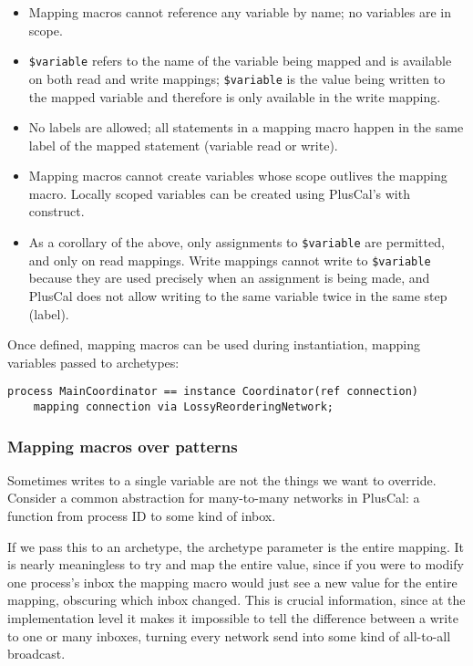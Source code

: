 \begin{itemize}
    \item Mapping macros cannot reference any variable by name; no variables are in scope.
    \item \lstinline|$variable| refers to the name of the variable being mapped and is available on both read and write mappings; \lstinline|$variable| is the value being written to the mapped variable and therefore is only available in the write mapping.
    \item No labels are allowed; all statements in a mapping macro happen in the same label of the mapped statement (variable read or write).
    \item Mapping macros cannot create variables whose scope outlives the mapping macro. Locally scoped variables can be created using PlusCal's with construct.
    \item As a corollary of the above, only assignments to \lstinline|$variable| are permitted, and only on read mappings. Write mappings cannot write to \lstinline|$variable| because they are used precisely when an assignment is being made, and PlusCal does not allow writing to the same variable twice in the same step (label).
\end{itemize}

Once defined, mapping macros can be used during instantiation, mapping variables passed to archetypes:

\begin{lstlisting}[language=pcal]
process MainCoordinator == instance Coordinator(ref connection)
    mapping connection via LossyReorderingNetwork;
\end{lstlisting}

\subsubsection{Mapping macros over patterns}

Sometimes writes to a single variable are not the things we want to override. Consider a common abstraction for many-to-many networks in PlusCal: a function from process ID to some kind of inbox.

If we pass this to an archetype, the archetype parameter is the entire mapping. It is nearly meaningless to try and map the entire value, since if you were to modify one process's inbox the mapping macro would just see a new value for the entire mapping, obscuring which inbox changed. This is crucial information, since at the implementation level it makes it impossible to tell the difference between a write to one or many inboxes, turning every network send into some kind of all-to-all broadcast.

